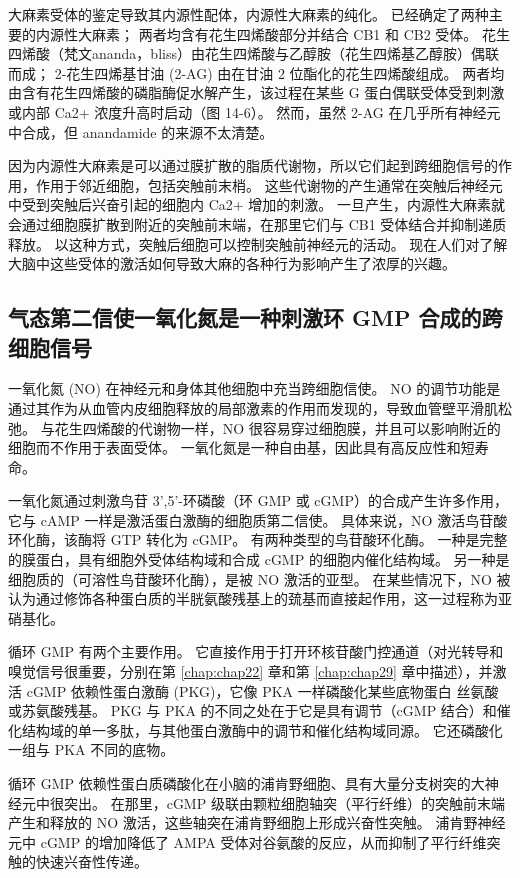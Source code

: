 大麻素受体的鉴定导致其内源性配体，内源性大麻素的纯化。 
已经确定了两种主要的内源性大麻素； 两者均含有花生四烯酸部分并结合 CB1 和 CB2 受体。 
花生四烯酸（梵文ananda，bliss）由花生四烯酸与乙醇胺（花生四烯基乙醇胺）偶联而成； 
2-花生四烯基甘油 (2-AG) 由在甘油 2 位酯化的花生四烯酸组成。 
两者均由含有花生四烯酸的磷脂酶促水解产生，该过程在某些 G 蛋白偶联受体受到刺激或内部 Ca2+ 浓度升高时启动（图 14-6）。 
然而，虽然 2-AG 在几乎所有神经元中合成，但 anandamide 的来源不太清楚。


因为内源性大麻素是可以通过膜扩散的脂质代谢物，所以它们起到跨细胞信号的作用，作用于邻近细胞，包括突触前末梢。
这些代谢物的产生通常在突触后神经元中受到突触后兴奋引起的细胞内 Ca2+ 增加的刺激。
一旦产生，内源性大麻素就会通过细胞膜扩散到附近的突触前末端，在那里它们与 CB1 受体结合并抑制递质释放。
以这种方式，突触后细胞可以控制突触前神经元的活动。 
现在人们对了解大脑中这些受体的激活如何导致大麻的各种行为影响产生了浓厚的兴趣。



\subsection{气态第二信使一氧化氮是一种刺激环 GMP 合成的跨细胞信号}

一氧化氮 (NO) 在神经元和身体其他细胞中充当跨细胞信使。 
NO 的调节功能是通过其作为从血管内皮细胞释放的局部激素的作用而发现的，导致血管壁平滑肌松弛。
与花生四烯酸的代谢物一样，NO 很容易穿过细胞膜，并且可以影响附近的细胞而不作用于表面受体。
一氧化氮是一种自由基，因此具有高反应性和短寿命。


一氧化氮通过刺激鸟苷 3',5'-环磷酸（环 GMP 或 cGMP）的合成产生许多作用，它与 cAMP 一样是激活蛋白激酶的细胞质第二信使。
具体来说，NO 激活鸟苷酸环化酶，该酶将 GTP 转化为 cGMP。 
有两种类型的鸟苷酸环化酶。 
一种是完整的膜蛋白，具有细胞外受体结构域和合成 cGMP 的细胞内催化结构域。
另一种是细胞质的（可溶性鸟苷酸环化酶），是被 NO 激活的亚型。
在某些情况下，NO 被认为通过修饰各种蛋白质的半胱氨酸残基上的巯基而直接起作用，这一过程称为亚硝基化。


循环 GMP 有两个主要作用。 它直接作用于打开环核苷酸门控通道（对光转导和嗅觉信号很重要，分别在第 \ref{chap:chap22} 章和第 \ref{chap:chap29} 章中描述），并激活 cGMP 依赖性蛋白激酶 (PKG)，它像 PKA 一样磷酸化某些底物蛋白 丝氨酸或苏氨酸残基。 
PKG 与 PKA 的不同之处在于它是具有调节（cGMP 结合）和催化结构域的单一多肽，与其他蛋白激酶中的调节和催化结构域同源。 
它还磷酸化一组与 PKA 不同的底物。


循环 GMP 依赖性蛋白质磷酸化在小脑的浦肯野细胞、具有大量分支树突的大神经元中很突出。
在那里，cGMP 级联由颗粒细胞轴突（平行纤维）的突触前末端产生和释放的 NO 激活，这些轴突在浦肯野细胞上形成兴奋性突触。 
浦肯野神经元中 cGMP 的增加降低了 AMPA 受体对谷氨酸的反应，从而抑制了平行纤维突触的快速兴奋性传递。




